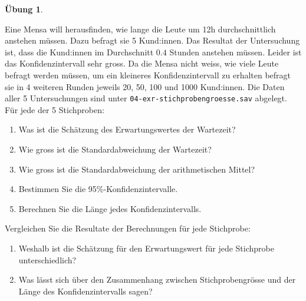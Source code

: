 \documentclass[
]{book}
\providecommand{\tightlist}{%
  \setlength{\itemsep}{0pt}\setlength{\parskip}{0pt}}
\theoremstyle{definition}
\theoremstyle{definition}
\theoremstyle{definition}
\newtheorem{exercise}{Übung}[chapter]
\theoremstyle{definition}
\theoremstyle{remark}
\begin{document}
\begin{exercise}
\protect\hypertarget{exr:ki-mean-n-vary}{}\label{exr:ki-mean-n-vary}\leavevmode

Eine Mensa will herausfinden, wie lange die Leute um 12h durchschnittlich anstehen müssen. Dazu befragt sie 5 Kund:innen. Das Resultat der Untersuchung ist, dass die Kund:innen im Durchschnitt \(0.4\) Stunden anstehen müssen. Leider ist das Konfidenzintervall sehr gross. Da die Mensa nicht weiss, wie viele Leute befragt werden müssen, um ein kleineres Konfidenzintervall zu erhalten befragt sie in 4 weiteren Runden jeweils 20, 50, 100 und 1000 Kund:innen. Die Daten aller 5 Untersuchungen sind unter \texttt{04-exr-stichprobengroesse.sav} abgelegt. Für jede der 5 Stichproben:

\begin{enumerate}
\def\labelenumi{\alph{enumi}.}
\tightlist
\item
  Was ist die Schätzung des Erwartungswertes der Wartezeit?
\item
  Wie gross ist die Standardabweichung der Wartezeit?
\item
  Wie gross ist die Standardabweichung der arithmetischen Mittel?
\item
  Bestimmen Sie die 95\%-Konfidenzintervalle.
\item
  Berechnen Sie die Länge jedes Konfidenzintervalls.
\end{enumerate}

Vergleichen Sie die Resultate der Berechnungen für jede Stichprobe:

\begin{enumerate}
\def\labelenumi{\alph{enumi}.}
\setcounter{enumi}{5}
\tightlist
\item
  Weshalb ist die Schätzung für den Erwartungswert für jede Stichprobe unterschiedlich?
\item
  Was lässt sich über den Zusammenhang zwischen Stichprobengrösse und der Länge des Konfidenzintervalls sagen?
\end{enumerate}

\end{exercise}
\end{document}
